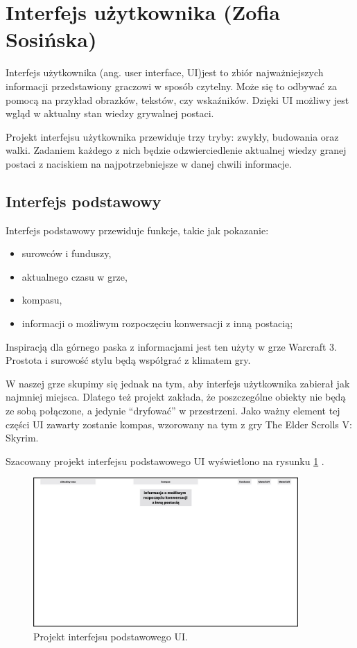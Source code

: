 \section{Interfejs użytkownika (Zofia Sosińska)}\label{chap:ui}
Interfejs użytkownika (ang. user interface, UI)jest to zbiór najważniejszych informacji przedstawiony graczowi w sposób czytelny. Może się to odbywać za pomocą na przykład obrazków, tekstów, czy wskaźników. Dzięki UI możliwy jest wgląd w aktualny stan wiedzy grywalnej postaci. 

Projekt interfejsu użytkownika przewiduje trzy tryby: zwykły, budowania oraz walki. Zadaniem każdego z nich będzie odzwierciedlenie aktualnej wiedzy granej postaci z naciskiem na najpotrzebniejsze w danej chwili informacje.
	
\subsection{Interfejs podstawowy}
Interfejs podstawowy przewiduje funkcje, takie jak pokazanie:
\begin{itemize}
    \item surowców i funduszy,
    \item aktualnego czasu w grze, 
    \item kompasu,
    \item informacji o możliwym  rozpoczęciu konwersacji z inną postacią;
\end{itemize}
Inspiracją dla górnego paska z informacjami jest ten użyty w grze Warcraft 3. Prostota i surowość stylu będą współgrać z klimatem gry.

W naszej grze skupimy się jednak na tym, aby interfejs użytkownika zabierał jak najmniej miejsca. Dlatego też projekt zakłada, że poszczególne obiekty nie będą ze sobą połączone, a jedynie “dryfować” w przestrzeni.
Jako ważny element tej części UI zawarty zostanie kompas, wzorowany na tym z gry The Elder Scrolls V: Skyrim.


Szacowany projekt interfejsu podstawowego UI wyświetlono na rysunku \ref{fig:ui_main} .
\begin{figure}[htbp]
    \centering
    \includegraphics[width=0.9\textwidth]{images/ui/ui_proj_ogolne.jpg}
    \caption{Projekt interfejsu podstawowego UI.
    }\label{fig:ui_main}
\end{figure}
 
